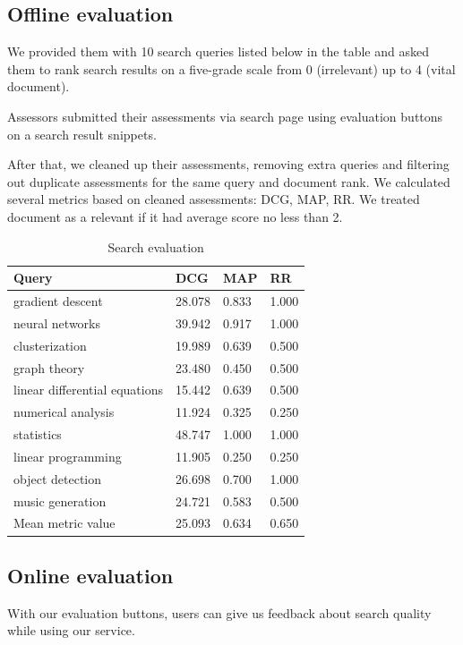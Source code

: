 \subsection{Offline evaluation}
We provided them with 10 search queries listed below in the table and asked them to rank search results on a five-grade scale from 0 (irrelevant) up to 4 (vital document).

Assessors submitted their assessments via search page using evaluation buttons on a search result snippets.

After that, we cleaned up their assessments, removing extra queries and filtering out duplicate assessments for the same query and document rank.
We calculated several metrics based on cleaned assessments: DCG, MAP, RR. We treated document as a relevant if it had average score no less than 2.

\begin{table}
    \centering 
    \begin{tabular}{| l | l | l | l |}
        \toprule
        Query & DCG & MAP & RR \\ 
        \midrule
        gradient descent & 28.078 & 0.833 & 1.000 \\  
        neural networks & 39.942 & 0.917 & 1.000 \\  
        clusterization & 19.989 & 0.639 & 0.500 \\  
        graph theory & 23.480 & 0.450 & 0.500 \\  
        linear differential equations & 15.442 & 0.639 & 0.500 \\  
        numerical analysis & 11.924 & 0.325 & 0.250 \\  
        statistics & 48.747 & 1.000 & 1.000 \\  
        linear programming & 11.905 & 0.250 & 0.250 \\  
        object detection & 26.698 & 0.700 & 1.000 \\  
        music generation & 24.721 & 0.583 & 0.500 \\ \hline 
        Mean metric value & 25.093 & 0.634 & 0.650 \\  
        \bottomrule
    \end{tabular}
    \caption{Search evaluation}
\end{table}

\subsection{Online evaluation}
With our evaluation buttons, users can give us feedback about search quality while using our service.

